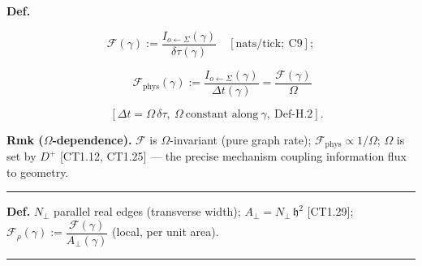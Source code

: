 \begin{definition}\label{tag:Def-H-5}
\textbf{Def.}

\[
\mathcal F(\gamma):=\frac{I_{o\leftarrow\Sigma}(\gamma)}{\delta\tau(\gamma)}\quad[\text{nats/tick};\ \mathrm{C9}];
\]

\[
\qquad \mathcal F_{\mathrm{phys}}(\gamma):=\frac{I_{o\leftarrow\Sigma}(\gamma)}{\Delta t(\gamma)}=\frac{\mathcal F(\gamma)}{\Omega}
\]

\[
\quad [\Delta t=\Omega\,\delta\tau,\ \Omega\ \text{constant along}\ \gamma,\ \mathrm{Def\text{-}H.2}].
\]

\textbf{Rmk ($\Omega$-dependence).} $\mathcal F$ is $\Omega$-invariant (pure graph rate); $\mathcal F_{\mathrm{phys}}\propto1/\Omega$; $\Omega$ is set by $D^+$ [CT1.12, CT1.25] — the precise mechanism coupling information flux to geometry.

\vspace{2pt}\noindent\rule{\textwidth}{0.4pt}\vspace{2pt}

\end{definition}

\begin{definition}\label{tag:Def-H-6}
\textbf{Def.} $N_\perp$ parallel real edges (transverse width); $ A_\perp=N_\perp\,\mathfrak h^2$ [CT1.29]; $ \mathcal F_\rho(\gamma):=\dfrac{\mathcal F(\gamma)}{A_\perp(\gamma)}$ (local, per unit area).

\vspace{2pt}\noindent\rule{\textwidth}{0.4pt}\vspace{2pt}

\end{definition}

